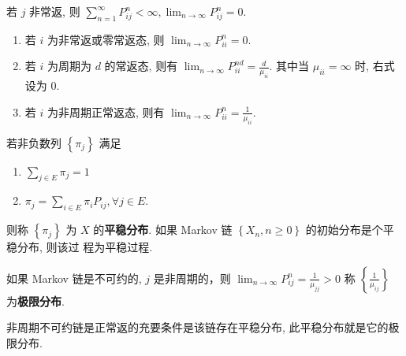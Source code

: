 \documentclass[10pt]{yerbaformat}
\begin{document}
\begin{corollary}
    若 $j$ 非常返, 则 $\sum_{n=1}^{\infty} P_{i j}^{n}<\infty, \lim _{n \rightarrow \infty} P_{i j}^{n}=0 .$
\end{corollary}

\begin{theorem}[基本极限定理]
    \begin{enumerate}
        \item 若 $i$ 为非常返或零常返态, 则 $\lim _{n \rightarrow \infty} P_{i i}^{n}=0 .$
        \item 若 $i$ 为周期为 $d$ 的常返态, 则有 $\lim _{n \rightarrow \infty} P_{i i}^{n d}=\frac{d}{\mu_{i i}}$.
              其中当 $\mu_{i i}=\infty$ 时, 右式设为 $0 .$
        \item 若 $i$ 为非周期正常返态, 则有 $\lim _{n \rightarrow \infty} P_{i i}^{n}=\frac{1}{\mu_{i i}}$.
    \end{enumerate}
\end{theorem}

\begin{definition}[平稳分布]
    若非负数列 $\left\{\pi_{j}\right\}$ 满足
    \begin{enumerate}
        \item $\sum_{j \in E} \pi_{j}=1$
        \item $\pi_{j}=\sum_{i \in E} \pi_{i} P_{i j}, \forall j \in E$.
    \end{enumerate}
    则称 $\left\{\pi_{j}\right\}$ 为 $X$ 的\textbf{平稳分布}. 如果 Markov 链 $\left\{X_{n}, n \geq 0\right\}$ 的初始分布是个平稳分布, 则该过
    程为平稳过程.
\end{definition}

\begin{lemma}
    如果 Markov 链是不可约的, $j$ 是非周期的，则 $\lim _{n \rightarrow \infty} P_{i j}^{n}=\frac{1}{\mu_{j j}}>0$ 称 $\left\{\frac{1}{\mu_{i j}}\right\}$ 为\textbf{极限分布}.
\end{lemma}

\begin{theorem}
    非周期不可约链是正常返的充要条件是该链存在平稳分布, 此平稳分布就是它的极限分布.
\end{theorem}
\end{document}
